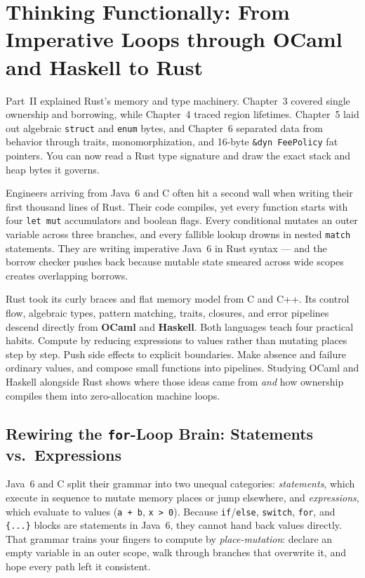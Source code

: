 \chapter{Thinking Functionally: From Imperative Loops through OCaml and Haskell to Rust}
\label{ch07:functional-thinking}

Part~II explained Rust's memory and type machinery. Chapter~3 covered single ownership and borrowing, while Chapter~4 traced region lifetimes. Chapter~5 laid out algebraic \texttt{struct} and \texttt{enum} bytes, and Chapter~6 separated data from behavior through traits, monomorphization, and 16-byte \texttt{\&dyn FeePolicy} fat pointers. You can now read a Rust type signature and draw the exact stack and heap bytes it governs.

Engineers arriving from Java~6 and C often hit a second wall when writing their first thousand lines of Rust. Their code compiles, yet every function starts with four \texttt{let mut} accumulators and boolean flags. Every conditional mutates an outer variable across three branches, and every fallible lookup drowns in nested \texttt{match} statements. They are writing imperative Java~6 in Rust syntax --- and the borrow checker pushes back because mutable state smeared across wide scopes creates overlapping borrows.

Rust took its curly braces and flat memory model from C and C++. Its control flow, algebraic types, pattern matching, traits, closures, and error pipelines descend directly from \textbf{OCaml} and \textbf{Haskell}. Both languages teach four practical habits. Compute by reducing expressions to values rather than mutating places step by step. Push side effects to explicit boundaries. Make absence and failure ordinary values, and compose small functions into pipelines. Studying OCaml and Haskell alongside Rust shows where those ideas came from \emph{and} how ownership compiles them into zero-allocation machine loops.

\chapterline

\section{Rewiring the \texttt{for}-Loop Brain: Statements vs.\ Expressions}
\label{ch07:statements-vs-expressions}

Java~6 and C split their grammar into two unequal categories: \emph{statements},
which execute in sequence to mutate memory places or jump elsewhere, and
\emph{expressions}, which evaluate to values (\texttt{a + b}, \texttt{x > 0}).
Because \texttt{if}/\texttt{else}, \texttt{switch}, \texttt{for}, and \texttt{\{...\}}
blocks are statements in Java~6, they cannot hand back values directly. That grammar
trains your fingers to compute by \emph{place-mutation}: declare an empty variable in
an outer scope, walk through branches that overwrite it, and hope every path left it
consistent.

